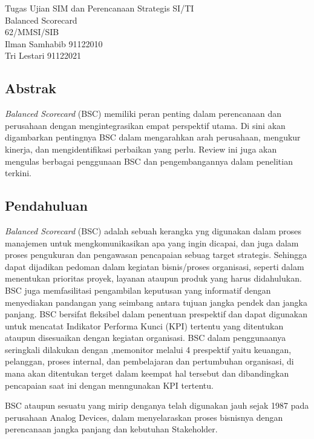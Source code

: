 \documentclass{article}
\title{}
\begin{document}
\begin{center}
    Tugas Ujian SIM dan Perencanaan Strategis SI/TI\\
    Balanced Scorecard\\
    62/MMSI/SIB\\
    Ilman Samhabib 91122010\\
    Tri Lestari 91122021\\	
\end{center}
\subsection*{Abstrak}



\emph{Balanced Scorecard} (BSC) memiliki peran penting dalam perencanaan dan perusahaan dengan mengintegrasikan empat perspektif utama. Di sini akan digambarkan pentingnya BSC dalam mengarahkan arah perusahaan, mengukur kinerja, dan mengidentifikasi perbaikan yang perlu. Review ini juga akan mengulas berbagai penggunaan BSC dan pengembangannya dalam penelitian terkini.
\subsection*{Pendahuluan}
\emph{Balanced Scorecard} (BSC) adalah sebuah kerangka yng digunakan dalam proses manajemen untuk mengkomunikasikan apa yang ingin dicapai, dan juga dalam proses pengukuran dan pengawasan pencapaian sebuag target strategis. Sehingga dapat dijadikan pedoman dalam kegiatan bisnis/proses organisasi, seperti dalam menentukan  prioritas proyek, layanan ataupun produk  yang harus didahulukan. BSC juga memfasilitasi pengambilan keputusan yang informatif dengan menyediakan pandangan yang seimbang antara tujuan jangka pendek dan jangka panjang. BSC bersifat fleksibel dalam penentuan prespektif dan dapat digunakan untuk mencatat Indikator Performa Kunci (KPI) tertentu yang ditentukan ataupun disesuaikan dengan kegiatan organisasi. BSC dalam penggunaanya seringkali dilakukan dengan ,memonitor melalui 4 prespektif yaitu  keuangan, pelanggan, proses internal, dan pembelajaran dan pertumbuhan organisasi, di mana akan ditentukan terget dalam keempat hal tersebut dan dibandingkan pencapaian saat ini dengan menngunakan KPI tertentu. 

BSC ataupun sesuatu yang mirip denganya  telah digunakan jauh sejak 1987 \cite{BSCAnalogBibEntry2023Jun} pada perusahaan Analog Devices, dalam menyelaraskan proses bisnisnya dengan perencanaan jangka panjang dan kebutuhan Stakeholder. 
\end{document}
